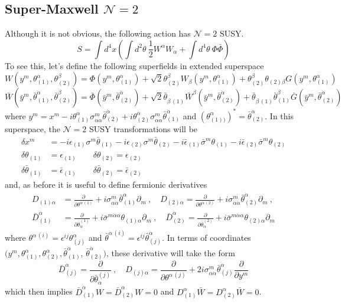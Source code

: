 \documentclass[a4paper,12pt]{article}
\numberwithin{equation}{section}
\numberwithin{exe}{section}
\newcommand{\p}{{\partial}}
\newcommand{\Db}{{\bar D}}
\newcommand{\Wb}{{\bar W}}
\renewcommand{\a}{{\alpha}}
\newcommand{\ad}{{\dot\alpha}}
\renewcommand{\b}{{\beta}}
\renewcommand{\d}{{\delta}}
\newcommand{\e}{{\epsilon}}
\newcommand{\eb}{{\bar\epsilon}}
\newcommand{\s}{{\sigma}}
\renewcommand{\sb}{{\bar\sigma}}
\renewcommand{\t}{{\theta}}
\newcommand{\tb}{{\bar\theta}}
\newcommand{\Phib}{{\bar \Phi}}
\begin{document}
\subsection{Super-Maxwell $\mathcal N=2$}
Although it is not obvious, the following action has $\mathcal N=2$ SUSY.
	\begin{equation}\label{n2theory}
	S = \int d^4x \left( \int d^2\t\ \frac12 W^\a W_\a + \int d^4\t\ \Phi\Phib \right)
	\end{equation}
To see this, let's define the following superfields in extended superspace
	\begin{equation}
	W(y^m, \t^\a_{(1)}, \t^\b_{(2)}) = \Phi(y^m, \t^\a_{(1)}) + \sqrt 2\t^\b_{(2)} W_\b(y^m, \t^\a_{(1)}) + \t^\b_{(2)}\t_{(2)\b} G(y^m, \t^\a_{(1)})
	\end{equation}
	\begin{equation}
	\bar W(\bar y^m, \bar\t^{\dot\a}_{(1)}, \bar\t^{\dot\b}_{(2)}) = \bar\Phi(\bar y^m, \bar\t^{\dot\a}_{(2)}) + \sqrt 2\bar\t_{{\dot\b}\,{(1)}} \bar W^{\dot\b} 
	(\bar y^m, \bar\t^{\dot\a}_{(2)}) + \bar\t_{{\dot\b}\,{(1)}}\bar\t_{(1)}^{\dot\b} \bar G(\bar y^m, \bar\t^{\dot\a}_{(2)})
	\end{equation}
where $y^m = x^m - i\t^\a_{(1)}\s^m_{\a\ad}\tb^\ad_{(2)} + i\t^\a_{(2)} \s^m_{\a\ad}\tb^\ad_{(1)}$ and $(\t^\a_{(1))})^*=
\bar\t^{\dot\a}_{(2)}$. In this superspace, the $\mathcal N=2$ SUSY transformations will be
	\begin{equation}
		\begin{aligned}
		\d x^m & = -i \e_{(1)} \s^m\tb_{(1)} -i\e_{(2)}\s^m\tb_{(2)} -i\eb_{(1)}\sb^m\t_{(1)}-i\eb_{(2)}\sb^m\t_{(2)} \\
		\d\t_{(1)} & =\e_{(1)}\qquad \d\t_{(2)}=\e_{(2)} \\
		\d\tb_{(1)} & =\eb_{(1)}\qquad \d\tb_{(2)}=\eb_{(2)}
		\end{aligned}
	\end{equation}
and, as before it is useful to define fermionic derivatives
	\begin{equation}
		\begin{aligned}
		D_{(1)\a} & = \frac{\p}{\p\t^{\a \,(1)}} + i\s^m_{\a\ad}\tb^\ad_{(1)}\p_m\ ,\quad D_{(2)\a} = \frac{\p}{\p\t^{\a\,(2)}} + i\s^m_{\a\ad} \tb^\ad_{(2)}\p_m \ , \\
		\Db^\ad_{(1)} & = \frac{\p}{\p\tb^{(1)}_\ad} + i\sb^{m\ad\a} \t_{(1)\a}\p_m\ ,\quad \Db^\ad_{(2)} = \frac{\p}{\p\tb^{(2)}_\ad} + i\sb^{m\ad\a} \t_{(2)\a}\p_m
		\end{aligned}
	\end{equation}
	where $\t^{\a\,{(i)}} = \epsilon^{ij}\t^\a_{(j)}$ and $\bar\t^{\dot\a\,{(i)}} = \epsilon^{ij}\bar\t^{\dot\a}_{(j)}$.
In terms of coordinates $(y^m, \t^\a_{(1)}, \t^\a_{(2)}, \tb^\ad_{(1)}$, $\tb^\ad_{(2)})$, these derivative will take the form
	\begin{equation}
	\Db^\ad_{(j)} = \frac{\p}{\p\tb^{(j)}_\ad}\ ,\quad D_{(j)\a} = \frac{\p}{\p\t^{\a\,(j)}} + 2i\s^m_{\a\ad} \tb^\ad_{(j)} \frac{\p}{\p y^m}
	\end{equation}
which then implies $\Db^\ad_{(1)} W = \Db^\ad_{(2)} W= 0$ and $D^\a_{(1)} \Wb = D^\a_{(2)} \Wb = 0$.
\end{document}
